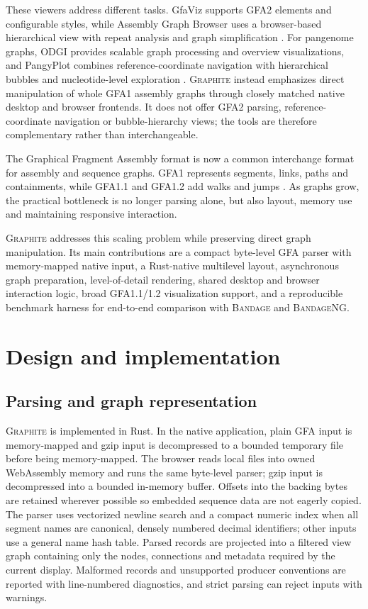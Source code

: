 \documentclass[11pt]{article}
\newcommand{\graphite}{\textsc{Graphite}\xspace}
\newcommand{\bandage}{\textsc{Bandage}\xspace}
\newcommand{\bandageng}{\textsc{BandageNG}\xspace}
\begin{document}
These viewers address different tasks. GfaViz supports GFA2 elements and configurable styles, while Assembly Graph Browser uses a browser-based hierarchical view with repeat analysis and graph simplification \citep{gonnella2019gfaviz,mikheenko2019agb}. For pangenome graphs, ODGI provides scalable graph processing and overview visualizations, and PangyPlot combines reference-coordinate navigation with hierarchical bubbles and nucleotide-level exploration \citep{guarracino2022odgi,mastromatteo2026pangyplot}. \graphite instead emphasizes direct manipulation of whole GFA1 assembly graphs through closely matched native desktop and browser frontends. It does not offer GFA2 parsing, reference-coordinate navigation or bubble-hierarchy views; the tools are therefore complementary rather than interchangeable.

The Graphical Fragment Assembly format is now a common interchange format for assembly and sequence graphs. GFA1 represents segments, links, paths and containments, while GFA1.1 and GFA1.2 add walks and jumps \citep{gfaspec}. As graphs grow, the practical bottleneck is no longer parsing alone, but also layout, memory use and maintaining responsive interaction.

\graphite addresses this scaling problem while preserving direct graph manipulation. Its main contributions are a compact byte-level GFA parser with memory-mapped native input, a Rust-native multilevel layout, asynchronous graph preparation, level-of-detail rendering, shared desktop and browser interaction logic, broad GFA1.1/1.2 visualization support, and a reproducible benchmark harness for end-to-end comparison with \bandage and \bandageng.

\section{Design and implementation}
\subsection{Parsing and graph representation}
\graphite is implemented in Rust. In the native application, plain GFA input is memory-mapped and gzip input is decompressed to a bounded temporary file before being memory-mapped. The browser reads local files into owned WebAssembly memory and runs the same byte-level parser; gzip input is decompressed into a bounded in-memory buffer. Offsets into the backing bytes are retained wherever possible so embedded sequence data are not eagerly copied. The parser uses vectorized newline search and a compact numeric index when all segment names are canonical, densely numbered decimal identifiers; other inputs use a general name hash table. Parsed records are projected into a filtered view graph containing only the nodes, connections and metadata required by the current display. Malformed records and unsupported producer conventions are reported with line-numbered diagnostics, and strict parsing can reject inputs with warnings.
\end{document}

